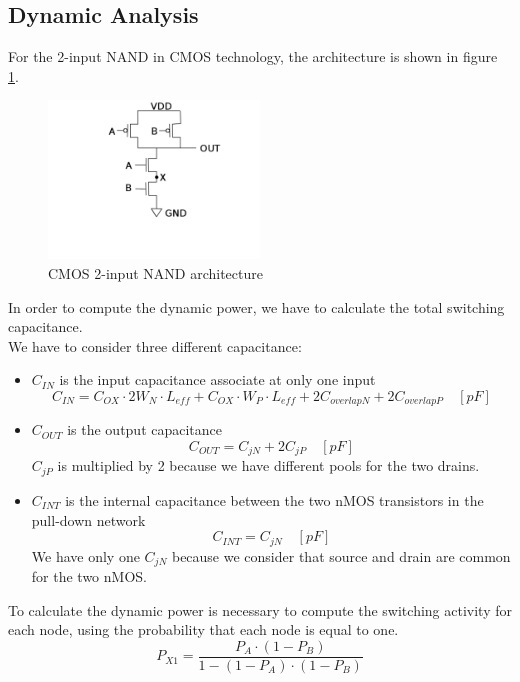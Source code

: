 \subsection{Dynamic Analysis}
For the 2-input NAND in CMOS technology, the architecture is shown in figure \ref{fig:nand-2}.
\begin{figure}[htbp]
\begin{center}
\includegraphics[width=0.5\textwidth]{img/Nand.pdf}
\caption{CMOS 2-input NAND architecture}
\label{fig:nand-2}
\end{center}
\end{figure}
In order to compute the dynamic power, we have to calculate the total switching capacitance. \\We have to consider three different capacitance:
\begin{itemize}
\item $C_{IN}$ is the input capacitance associate at only one input
\begin{equation}
C_{IN}= C_{OX} \cdotp 2W_N \cdotp L_{eff} + C_{OX} \cdotp W_P \cdotp L_{eff} + 2C_{overlapN}+ 2C_{overlapP} \quad [pF]
\end{equation}
\item $C_{OUT}$ is the output capacitance
\begin{equation}
C_{OUT}=C_{jN} + 2C_{jP} \quad [pF]
\end{equation}
$C_{jP}$ is multiplied by 2 because we have different pools for the two drains.
\item $C_{INT}$ is the internal capacitance between the two nMOS transistors in the pull-down network
\begin{equation}
C_{INT}=C_{jN} \quad [pF]
\end{equation}
We have only one $C_{jN}$ because we consider that source and drain are common for the two nMOS.
\end{itemize}
To calculate the dynamic power is necessary to compute the switching activity for each node, using the probability that each node is equal to one.
\begin{equation}
P_{X1}=\frac{P_A \cdotp (1-P_B)}{1-(1-P_A) \cdotp (1-P_B)}
\end{equation}
